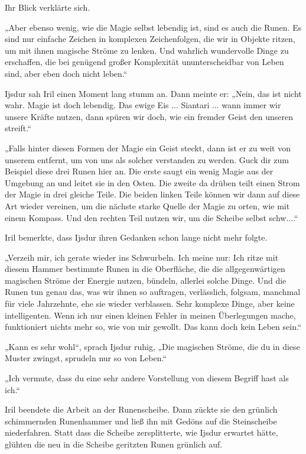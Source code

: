 Ihr Blick verklärte sich.

„Aber ebenso wenig, wie die Magie selbst lebendig ist, sind es auch die Runen. Es sind nur einfache Zeichen in komplexen Zeichenfolgen, die wir in Objekte ritzen, um mit ihnen magische Ströme zu lenken. Und wahrlich wundervolle Dinge zu erschaffen, die bei genügend großer Komplexität ununterscheidbar von Leben sind, aber eben doch nicht leben.“

Ijsdur sah Iril einen Moment lang stumm an. Dann meinte er: „Nein, das ist nicht wahr. Magie ist doch lebendig. Das ewige Eis ... Siantari ... wann immer wir unsere Kräfte nutzen, dann spüren wir doch, wie ein fremder Geist den unseren streift.“

„Falls hinter diesen Formen der Magie ein Geist steckt, dann ist er zu weit von unserem entfernt, um von uns als solcher verstanden zu werden. Guck dir zum Beispiel diese drei Runen hier an. Die erste saugt ein wenig Magie aus der Umgebung an und leitet sie in den Osten. Die zweite da drüben teilt einen Strom der Magie in drei gleiche Teile. Die beiden linken Teile können wir dann auf diese Art wieder vereinen, um die nächste starke Quelle der Magie zu orten, wie mit einem Kompass. Und den rechten Teil nutzen wir, um die Scheibe selbst schw....“

Iril bemerkte, dass Ijsdur ihren Gedanken schon lange nicht mehr folgte.

„Verzeih mir, ich gerate wieder ins Schwurbeln. Ich meine nur: Ich ritze mit diesem Hammer bestimmte Runen in die Oberfläche, die die allgegenwärtigen magischen Ströme der Energie nutzen, bündeln, allerlei solche Dinge. Und die Runen tun genau das, was wir ihnen so auftragen, verlässlich, folgsam, manchmal für viele Jahrzehnte, ehe sie wieder verblassen. Sehr komplexe Dinge, aber keine intelligenten. Wenn ich nur einen kleinen Fehler in meinen Überlegungen mache, funktioniert nichts mehr so, wie von mir gewollt. Das kann doch kein Leben sein.“

„Kann es sehr wohl“, sprach Ijsdur ruhig, „Die magischen Ströme, die du in diese Muster zwingst, sprudeln nur so von Leben.“

„Ich vermute, dass du eine sehr andere Vorstellung von diesem Begriff hast als ich.“

Iril beendete die Arbeit an der Runenscheibe. Dann zückte sie den grünlich schimmernden Runenhammer und ließ ihn mit Gedöns auf die Steinscheibe niederfahren. Statt dass die Scheibe zersplitterte, wie Ijsdur erwartet hätte, glühten die neu in die Scheibe geritzten Runen grünlich auf.


